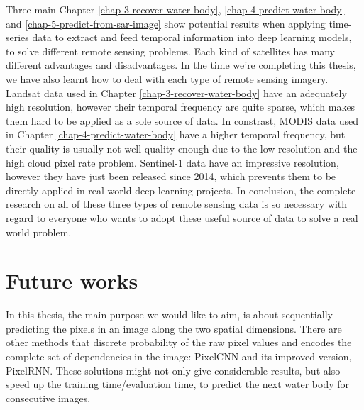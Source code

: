 Three main Chapter \ref{chap-3-recover-water-body}, \ref{chap-4-predict-water-body} and \ref{chap-5-predict-from-sar-image} show potential results when applying time-series data to extract and feed temporal information into deep learning models, to solve different remote sensing problems. Each kind of satellites has many different advantages and disadvantages. In the time we're completing this thesis, we have also learnt how to deal with each type of remote sensing imagery. Landsat data used in Chapter \ref{chap-3-recover-water-body} have an adequately high resolution, however their temporal frequency are quite sparse, which makes them hard to be applied as a sole source of data. In constrast, MODIS data used in Chapter \ref{chap-4-predict-water-body} have a higher temporal frequency, but their quality is usually not well-quality enough due to the low resolution and the high cloud pixel rate problem. Sentinel-1 data have an impressive resolution, however they have just been released since 2014, which prevents them to be directly applied in real world deep learning projects. In conclusion, the complete research on all of these three types of remote sensing data is so necessary with regard to everyone who wants to adopt these useful source of data to solve a real world problem.  

\section{Future works}

In this thesis, the main purpose we would like to aim, is about sequentially predicting the pixels in an image along the two spatial dimensions. There are other methods that discrete probability of the raw pixel values and encodes the complete set of dependencies in the image: PixelCNN \cite{OordKK16} and its improved version, PixelRNN\cite{OordKVEGK16}. These solutions might not only give considerable results, but also speed up the training time/evaluation time, to predict the next water body for consecutive images.

